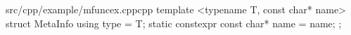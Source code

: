 \begin{fileminted}{src/cpp/example/mfuncex.cpp}{cpp}
template <typename T, const char* name>
struct MetaInfo { 
    using type = T;
    static constexpr const char* name = name;
};
\end{fileminted}
    